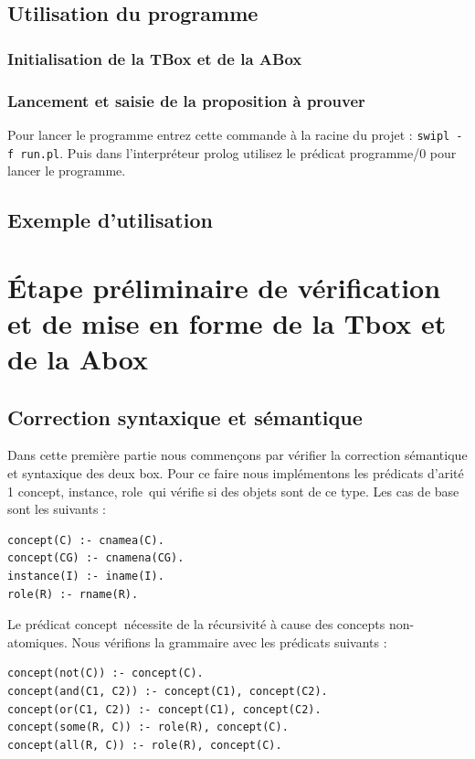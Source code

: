 \documentclass{article}
\begin{document}
\subsection{Utilisation du programme}
\subsubsection{Initialisation de la TBox et de la ABox}

\subsubsection{Lancement et saisie de la proposition à prouver}
Pour lancer le programme entrez cette commande à la racine du projet : \verb|swipl -f run.pl|. Puis dans l'interpréteur prolog utilisez le prédicat \color{blue} programme/0 \color{black} pour lancer le programme.


\subsection{Exemple d'utilisation}


\section{\'Etape préliminaire de vérification et de mise en forme de la Tbox et de la Abox}
\subsection{Correction syntaxique et sémantique}
Dans cette première partie nous commençons par vérifier la correction sémantique et syntaxique des deux box. Pour ce faire nous implémentons les prédicats d'arité 1 \color{blue}concept, instance, role\color{black}\ qui vérifie si des objets sont de ce type. Les cas de base sont les suivants :

\begin{verbatim}
concept(C) :- cnamea(C).
concept(CG) :- cnamena(CG). 
instance(I) :- iname(I).
role(R) :- rname(R). 
\end{verbatim}

Le prédicat \color{blue}concept\color{black}\ nécessite de la récursivité à cause des concepts non-atomiques. Nous vérifions la grammaire avec les prédicats suivants :

\begin{verbatim}
concept(not(C)) :- concept(C).
concept(and(C1, C2)) :- concept(C1), concept(C2).
concept(or(C1, C2)) :- concept(C1), concept(C2).
concept(some(R, C)) :- role(R), concept(C).
concept(all(R, C)) :- role(R), concept(C).
\end{verbatim}
\end{document}
